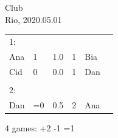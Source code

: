 \documentclass{scrartcl}
\begin{document}
\setlength{\parindent}{0cm}
\small
Club\\
Rio, 2020.05.01\\
\begin{longtable}[l]{@{}llr@{/}rlr}
1:\\
Ana  &  1   &  1.0  &  1   &Bia  &  \\
Cid  &  0   &  0.0  &  1   &Dan  &  \\
\\
2:\\
Dan  &  =0  &  0.5  &  2   &Ana  &  \\
\end{longtable}

4 games: +2 -1 =1
\end{document}
